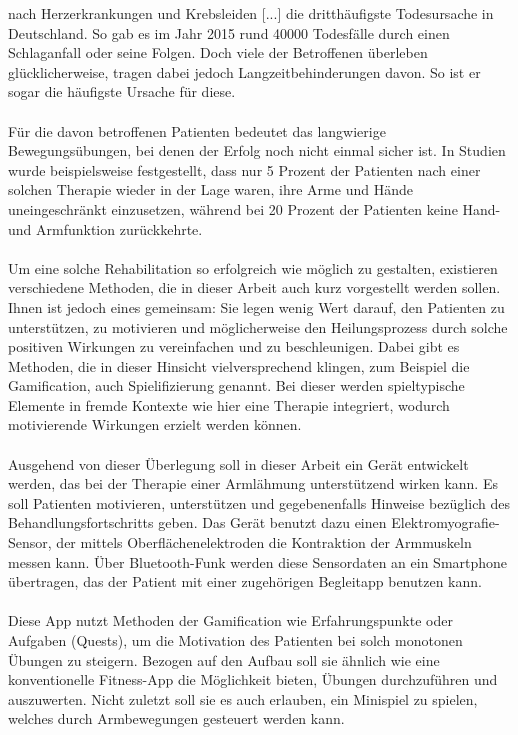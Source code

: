  nach Herzerkrankungen und Krebsleiden [...] die dritthäufigste Todesursache in Deutschland.\grqq\cite{Src:ApoFlex} So gab es im Jahr 2015 rund 40000 Todesfälle durch einen Schlaganfall oder seine Folgen.\cite{Src:Destatis} Doch viele der Betroffenen überleben glücklicherweise, tragen dabei jedoch Langzeitbehinderungen davon. So ist er sogar die häufigste Ursache für diese. \\ \\
Für die davon betroffenen Patienten bedeutet das langwierige Bewegungsübungen, bei denen der Erfolg noch nicht einmal sicher ist. In Studien wurde beispielsweise festgestellt, dass nur 5 Prozent der Patienten nach einer solchen Therapie wieder in der Lage waren, ihre Arme und Hände uneingeschränkt einzusetzen, während bei 20 Prozent der Patienten keine Hand- und Armfunktion zurückkehrte.\cite{Src:RehabNelles} \\ \\
Um eine solche Rehabilitation so erfolgreich wie möglich zu gestalten, existieren verschiedene Methoden, die in dieser Arbeit auch kurz vorgestellt werden sollen. Ihnen ist jedoch eines gemeinsam: Sie legen wenig Wert darauf, den Patienten zu unterstützen, zu motivieren und möglicherweise den Heilungsprozess durch solche positiven Wirkungen zu vereinfachen und zu beschleunigen. Dabei gibt es Methoden, die in dieser Hinsicht vielversprechend klingen, zum Beispiel die Gamification, auch Spielifizierung genannt. Bei dieser werden spieltypische Elemente in fremde Kontexte wie hier eine Therapie integriert, wodurch motivierende Wirkungen erzielt werden können. \\ \\
Ausgehend von dieser Überlegung soll in dieser Arbeit ein Gerät entwickelt werden, das bei der Therapie einer Armlähmung unterstützend wirken kann. Es soll Patienten motivieren, unterstützen und gegebenenfalls Hinweise bezüglich des Behandlungsfortschritts geben. Das Gerät benutzt dazu einen Elektromyografie-Sensor, der mittels Oberflächenelektroden die Kontraktion der Armmuskeln messen kann. Über Bluetooth-Funk werden diese Sensordaten an ein Smartphone übertragen, das der Patient mit einer zugehörigen Begleitapp benutzen kann. \\ \\
Diese App nutzt Methoden der Gamification wie Erfahrungspunkte oder Aufgaben (\glqq Quests\grqq), um die Motivation des Patienten bei solch monotonen Übungen zu steigern. Bezogen auf den Aufbau soll sie ähnlich wie eine konventionelle Fitness-App die Möglichkeit bieten, Übungen durchzuführen und auszuwerten. Nicht zuletzt soll sie es auch erlauben, ein Minispiel zu spielen, welches durch Armbewegungen gesteuert werden kann. \\ \\
